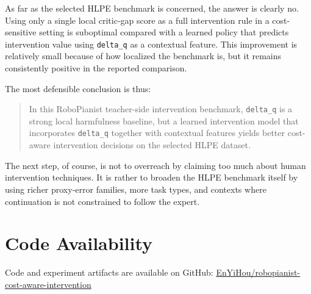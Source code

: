 \documentclass[11pt]{article}
\begin{document}
As far as the selected HLPE benchmark is concerned, the answer is clearly no. Using only a single local critic-gap score as a full intervention rule in a cost-sensitive setting is suboptimal compared with a learned policy that predicts intervention value using \texttt{delta\_q} as a contextual feature. This improvement is relatively small because of how localized the benchmark is, but it remains consistently positive in the reported comparison.

The most defensible conclusion is thus:

\begin{quote}
In this RoboPianist teacher-side intervention benchmark, \texttt{delta\_q} is a strong local harmfulness baseline, but a learned intervention model that incorporates \texttt{delta\_q} together with contextual features yields better cost-aware intervention decisions on the selected HLPE dataset.
\end{quote}

The next step, of course, is not to overreach by claiming too much about human intervention techniques. It is rather to broaden the HLPE benchmark itself by using richer proxy-error families, more task types, and contexts where continuation is not constrained to follow the expert.

\section*{Code Availability}

Code and experiment artifacts are available on GitHub: \href{https://github.com/EnYiHou/robopianist-cost-aware-intervention}{EnYiHou/robopianist-cost-aware-intervention}
\end{document}
